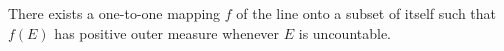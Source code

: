 There exists a one-to-one mapping $f$ of the line onto a subset of itself such that $f(E)$ has positive outer measure whenever $E$ is uncountable.
